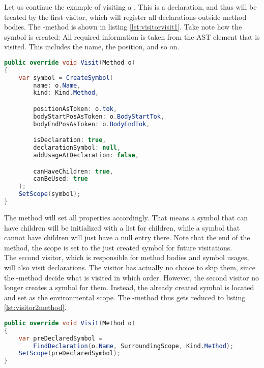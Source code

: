 Let us continue the example of visiting a .
This is a declaration, and thus will be treated by the first visitor, which will register all declarations outside method bodies.
The -method is shown in listing \ref{lst:visitorvisit1}.
Take note how the symbol is created: All required information is taken from the AST element  that is visited.
This includes the name, the position, and so on.\\

\begin{lstlisting}[language=csharp, caption={Visiting a Method, First Visitor}, captionpos=b, label={lst:visitorvisit1}]
public override void Visit(Method o)
{
    var symbol = CreateSymbol(
        name: o.Name,
        kind: Kind.Method,

        positionAsToken: o.tok,
        bodyStartPosAsToken: o.BodyStartTok,
        bodyEndPosAsToken: o.BodyEndTok,

        isDeclaration: true,
        declarationSymbol: null,
        addUsageAtDeclaration: false,

        canHaveChildren: true,
        canBeUsed: true
    );
    SetScope(symbol);
}
\end{lstlisting}

The  method will set all properties accordingly.
That means a symbol that can have children will be initialized with a list for children,
while a symbol that cannot have children will just have a null entry there.
Note that the end of the method, the scope is set to the just created symbol for future visitations.\\

The second visitor, which is responsible for method bodies and symbol usages,
will also visit declarations.
The visitor has actually no choice to skip them, since the -method decide what is visited in which order.
However, the second visitor no longer creates a symbol for them.
Instead, the already created symbol is located and set as the environmental scope.
The -method thus gets reduced to listing \ref{lst:visitor2method}.

\begin{lstlisting}[language=csharp, caption={Visiting a Method, Second Visitor}, captionpos=b, label={lst:visitor2method}]
public override void Visit(Method o)
{
    var preDeclaredSymbol = 
        FindDeclaration(o.Name, SurroundingScope, Kind.Method);
    SetScope(preDeclaredSymbol);
}
\end{lstlisting}

